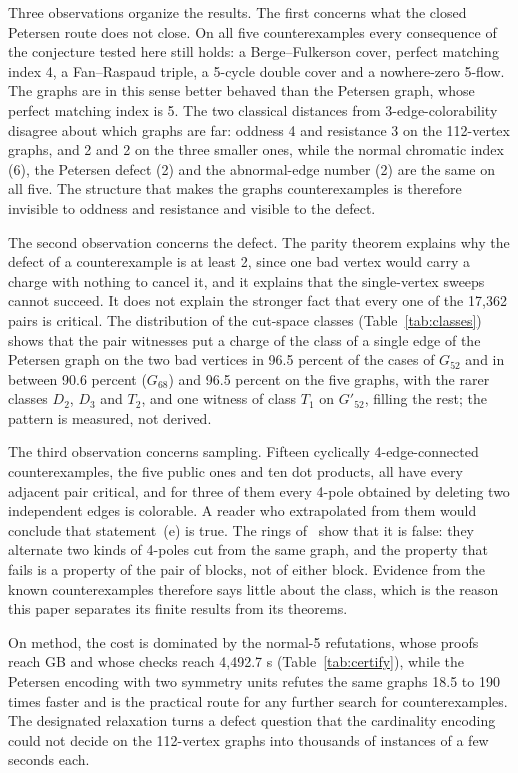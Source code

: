 \documentclass[11pt]{article}
\theoremstyle{definition}
\theoremstyle{remark}
\newcommand{\Gfty}{G_{52}}
\newcommand{\Gftyb}{G'_{52}}
\newcommand{\Gsix}{G_{68}}
\begin{document}
Three observations organize the results. The first concerns what the closed Petersen route does not
close. On all five counterexamples every consequence of the conjecture tested here still holds: a
Berge--Fulkerson cover, perfect matching index 4, a Fan--Raspaud triple, a 5-cycle double cover and a
nowhere-zero 5-flow. The graphs are in this sense better behaved than the Petersen graph, whose
perfect matching index is 5. The two classical distances from 3-edge-colorability disagree about which
graphs are far: oddness 4 and resistance 3 on the 112-vertex graphs, and 2 and 2 on the three smaller
ones, while the normal chromatic index (6), the Petersen defect (2) and the abnormal-edge number (2)
are the same on all five. The structure that makes the graphs counterexamples is therefore invisible to
oddness and resistance and visible to the defect.

The second observation concerns the defect. The parity theorem explains why the defect of a
counterexample is at least 2, since one bad vertex would carry a charge with nothing to cancel it, and
it explains that the single-vertex sweeps cannot succeed. It does not explain the stronger fact that
every one of the 17{,}362 pairs is critical. The distribution of the cut-space classes
(Table~\ref{tab:classes}) shows that the pair witnesses put a charge of the class of a single edge of the
Petersen graph on the two bad vertices in 96.5 percent of the cases of $\Gfty$ and in between 90.6
percent ($\Gsix$) and 96.5 percent on the five graphs, with the rarer classes $D_2$, $D_3$ and $T_2$,
and one witness of class $T_1$ on $\Gftyb$, filling the rest; the
pattern is measured, not derived.

The third observation concerns sampling. Fifteen cyclically 4-edge-connected counterexamples, the five
public ones and ten dot products, all have every adjacent pair critical, and for three of them every 4-pole obtained by deleting
two independent edges is colorable. A reader who extrapolated from them would conclude that
statement~(e) is true. The rings of~\cite{UD2026} show that it is false: they alternate two kinds of
4-poles cut from the same graph, and the property that fails is a property of the pair of blocks, not of
either block. Evidence from the known counterexamples therefore says little about the class, which is the
reason this paper separates its finite results from its theorems.

On method, the cost is dominated by the normal-5 refutations, whose proofs reach \MaxProofGB{} GB and
whose checks reach 4{,}492.7 s (Table~\ref{tab:certify}), while the Petersen encoding with two symmetry
units refutes the same graphs 18.5 to 190 times faster and is the practical route for any further search
for counterexamples. The designated relaxation turns a defect question that the cardinality encoding
could not decide on the 112-vertex graphs into thousands of instances of a few seconds each.
\end{document}
